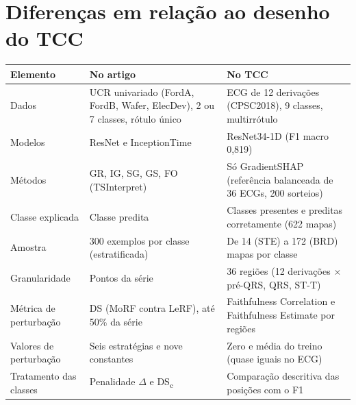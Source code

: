 \documentclass[11pt,a4paper]{article}
\begin{document}
\section{Diferenças em relação ao desenho do TCC}
\begin{center}\small
\begin{tabularx}{\linewidth}{lXX}
\toprule
\textbf{Elemento} & \textbf{No artigo} & \textbf{No TCC} \\
\midrule
Dados & UCR univariado (FordA, FordB, Wafer, ElecDev), 2 ou 7 classes, rótulo único & ECG de 12 derivações (CPSC2018), 9 classes, multirrótulo \\ \addlinespace
Modelos & ResNet e InceptionTime & ResNet34-1D (F1 macro 0,819) \\ \addlinespace
Métodos & GR, IG, SG, GS, FO (TSInterpret) & Só GradientSHAP (referência balanceada de 36 ECGs, 200 sorteios) \\ \addlinespace
Classe explicada & Classe predita & Classes presentes e preditas corretamente (622 mapas) \\ \addlinespace
Amostra & 300 exemplos por classe (estratificada) & De 14 (STE) a 172 (BRD) mapas por classe \\ \addlinespace
Granularidade & Pontos da série & 36 regiões (12 derivações $\times$ pré-QRS, QRS, ST-T) \\ \addlinespace
Métrica de perturbação & DS (MoRF contra LeRF), até 50\% da série & Faithfulness Correlation e Faithfulness Estimate por regiões \\ \addlinespace
Valores de perturbação & Seis estratégias e nove constantes & Zero e média do treino (quase iguais no ECG) \\ \addlinespace
Tratamento das classes & Penalidade $\Delta$ e DS\textsubscript{c} & Comparação descritiva das posições com o F1 \\
\bottomrule
\end{tabularx}
\end{center}
\end{document}
